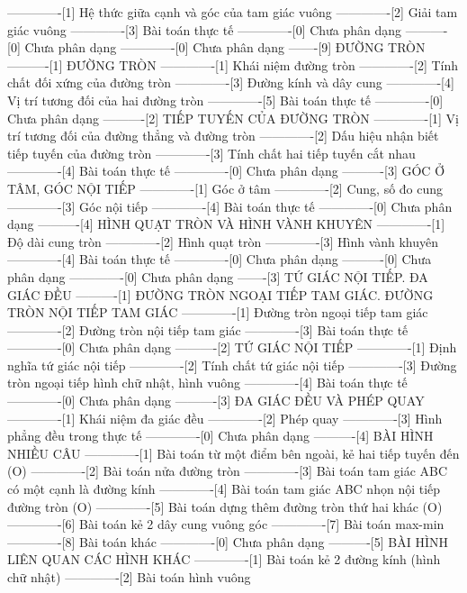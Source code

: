 -------------[1] Hệ thức giữa cạnh và góc của tam giác vuông
-------------[2] Giải tam giác vuông
-------------[3] Bài toán thực tế
-------------[0] Chưa phân dạng
----------[0] Chưa phân dạng
-------------[0] Chưa phân dạng
-------[9] ĐƯỜNG TRÒN
----------[1] ĐƯỜNG TRÒN
-------------[1] Khái niệm đường tròn
-------------[2] Tính chất đối xứng của đường tròn
-------------[3] Đường kính và dây cung
-------------[4] Vị trí tương đối của hai đường tròn
-------------[5] Bài toán thực tế
-------------[0] Chưa phân dạng
----------[2] TIẾP TUYẾN CỦA ĐƯỜNG TRÒN
-------------[1] Vị trí tương đối của đường thẳng và đường tròn
-------------[2] Dấu hiệu nhận biết tiếp tuyến của đường tròn
-------------[3] Tính chất hai tiếp tuyến cắt nhau
-------------[4] Bài toán thực tế
-------------[0] Chưa phân dạng
----------[3] GÓC Ở TÂM, GÓC NỘI TIẾP
-------------[1] Góc ở tâm
-------------[2] Cung, số đo cung
-------------[3] Góc nội tiếp
-------------[4] Bài toán thực tế
-------------[0] Chưa phân dạng
----------[4] HÌNH QUẠT TRÒN VÀ HÌNH VÀNH KHUYÊN
-------------[1] Độ dài cung tròn
-------------[2] Hình quạt tròn
-------------[3] Hình vành khuyên
-------------[4] Bài toán thực tế
-------------[0] Chưa phân dạng
----------[0] Chưa phân dạng
-------------[0] Chưa phân dạng
-------[3] TỨ GIÁC NỘI TIẾP. ĐA GIÁC ĐỀU
----------[1] ĐƯỜNG TRÒN NGOẠI TIẾP TAM GIÁC. ĐƯỜNG TRÒN NỘI TIẾP TAM GIÁC
-------------[1] Đường tròn ngoại tiếp tam giác
-------------[2] Đường tròn nội tiếp tam giác
-------------[3] Bài toán thực tế
-------------[0] Chưa phân dạng
----------[2] TỨ GIÁC NỘI TIẾP
-------------[1] Định nghĩa tứ giác nội tiếp
-------------[2] Tính chất tứ giác nội tiếp
-------------[3] Đường tròn ngoại tiếp hình chữ nhật, hình vuông
-------------[4] Bài toán thực tế
-------------[0] Chưa phân dạng
----------[3] ĐA GIÁC ĐỀU VÀ PHÉP QUAY
-------------[1] Khái niệm đa giác đều
-------------[2] Phép quay
-------------[3] Hình phẳng đều trong thực tế
-------------[0] Chưa phân dạng
----------[4] BÀI HÌNH NHIỀU CÂU
-------------[1] Bài toán từ một điểm bên ngoài, kẻ hai tiếp tuyến đến (O)
-------------[2] Bài toán nửa đường tròn
-------------[3] Bài toán tam giác ABC có một cạnh là đường kính
-------------[4] Bài toán tam giác ABC nhọn nội tiếp đường tròn (O)
-------------[5] Bài toán dựng thêm đường tròn thứ hai khác (O)
-------------[6] Bài toán kẻ 2 dây cung vuông góc
-------------[7] Bài toán max-min
-------------[8] Bài toán khác
-------------[0] Chưa phân dạng
----------[5] BÀI HÌNH LIÊN QUAN CÁC HÌNH KHÁC
-------------[1] Bài toán kẻ 2 đường kính (hình chữ nhật)
-------------[2] Bài toán hình vuông
